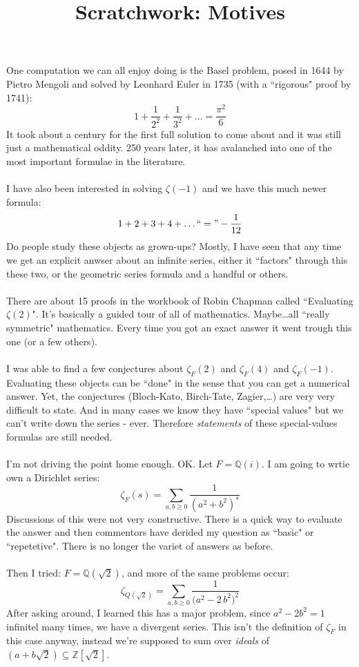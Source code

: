 \documentclass[12pt]{article}
\title{Scratchwork: Motives}
\date{}
\begin{document}

\sffamily

\maketitle

\noindent One computation we can all enjoy doing is the Basel problem, posed in 1644 by Pietro Mengoli and solved by Leonhard Euler in 1735 (with a ``rigorous" proof by 1741):
$$ 1 + \frac{1}{2^2} + \frac{1}{3^2} + \dots = \frac{\pi^2}{6} $$
It took about a century for the first full solution to come about and it was still just a mathematical oddity.  250 years later, it has avalanched into one of the most important formulae in the literature. \\\\
I have also been interested in solving $\zeta(-1)$ and we have this much newer formula:
$$ 1 + 2 + 3 + 4 + \dots ``=" - \frac{1}{12} $$
Do people study these objects as grown-ups?  Mostly, I have seen that any time we get an explicit anwser about an infinite series, either it ``factors" through this these two, or the geometric series formula and a handful or others.  \\ \\
There are about 15 proofs in the workbook of Robin Chapman called ``Evaluating $\zeta(2)$".  It's basically a guided tour of all of mathematics.  Maybe\dots all ``really symmetric" mathematics.  Every time you got an exact answer it went trough this one (or a few others). \\ \\
I was able to find a few conjectures about $\zeta_F(2)$ and $\zeta_F(4)$ and $\zeta_F(-1)$.  Evaluating these objects can be ``done" in the sense that you can get a numerical answer.  Yet, the conjectures (Bloch-Kato, Birch-Tate, Zagier,\dots) are very very difficult to state.  And in many cases we know they have ``special values" but we can't write down the series - ever.  Therefore \textit{statements} of these special-values formulas are still needed. \\ \\
I'm not driving the point home enough. OK.   Let $F = \mathbb{Q}(i)$.  I am going to wrtie own a Dirichlet series:
$$ \zeta_F(s) = \sum_{a,b \geq 0} \frac{1}{(a^2 + b^2)^s} $$ 
Discussions of this were not very constructive.  There is a quick way to evaluate the answer and then commentors have derided my question as ``basic" or ``repetetive".  There is no longer the variet of answers as before.\\ \\
Then I tried: $F = \mathbb{Q}(\sqrt{2})$, and more of the same problems occur:
$$ \zeta_{Q(\sqrt{2})} = \sum_{a,b \geq 0} \frac{1}{\big(a^2 - 2\, b^2\big)^2} $$
After asking around, I learned this has a major problem, since $a^2 - 2b^2 = 1$ infinitel many times, we have a divergent series.  This isn't the definition of $\zeta_F$ in this case anyway, instead we're supposed to sum over \textit{ideals} of  $(a + b \sqrt{2}) \subseteq \mathbb{Z}[\sqrt{2}]$.
\end{document}
